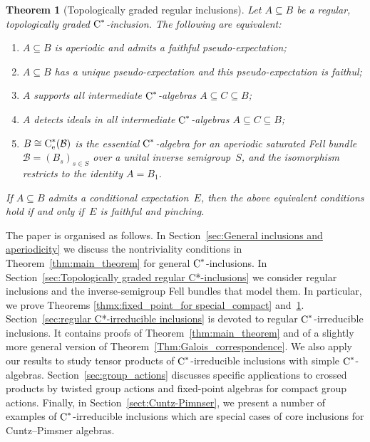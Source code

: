 \documentclass[a4paper]{amsart}
\theoremstyle{plain}
\newtheorem{thmx}{Theorem}
\theoremstyle{definition}
\theoremstyle{remark}
\numberwithin{theorem}{section}
\numberwithin{equation}{section}
\newcommand*{\nb}{\nobreakdash}
\newcommand*{\ess}{\mathrm{e}}%
\newcommand*{\Cst}{\textup C^*}%
\newcommand*{\B}{\mathcal B}%
\begin{document}
\begin{thmx}[Topologically graded regular inclusions]
  \label{thmx:topologically_graded_aperiodic}
  Let \(A\subseteq B\) be a regular, topologically graded
  \(\Cst\)\nb-inclusion.
  The following are equivalent:
  \begin{enumerate}
  \item \label{enu:topologically_graded_aperiodic1}%
    \(A\subseteq B\) is aperiodic and admits a faithful
    pseudo-expectation;
  \item \label{enu:topologically_graded_aperiodic2}%
    \(A\subseteq B\) has a unique pseudo-expectation and this
    pseudo-expectation is faithul;
  \item \label{enu:topologically_graded_aperiodic3}%
    \(A\) supports all intermediate \(\Cst\)\nb-algebras \(A\subseteq
    C\subseteq B\);
  \item \label{enu:topologically_graded_aperiodic4}%
    \(A\) detects ideals in all intermediate \(\Cst\)\nb-algebras
    \(A\subseteq C \subseteq B\);
  \item \label{enu:topologically_graded_aperiodic5}%
    \(B\cong \Cst_\ess(\B)\) is the essential \(\Cst\)\nb-algebra for
    an aperiodic saturated Fell bundle \(\B=(B_s)_{s\in S}\) over a
    unital inverse semigroup~\(S\), and the isomorphism restricts to
    the identity \(A=B_1\).
  \end{enumerate}
  If \(A\subseteq B\) admits a conditional expectation~\(E\), then the
  above equivalent conditions hold if and only if~\(E\) is faithful
  and pinching.
\end{thmx}

The paper is organised as follows.
In Section~\ref{sec:General inclusions and aperiodicity} we discuss
the nontriviality conditions in Theorem~\ref{thm:main_theorem} for
general \(\Cst\)\nb-inclusions.
In Section~\ref{sec:Topologically graded regular C*-inclusions} we
consider regular inclusions and the inverse-semigroup Fell bundles
that model them.
In particular, we prove Theorems \ref{thmx:fixed_point_for
  special_compact} and~\ref{thmx:topologically_graded_aperiodic}.
Section~\ref{sec:regular C*-irreducible inclusions} is devoted to
regular \(\Cst\)\nb-irreducible inclusions.
It contains proofs of Theorem~\ref{thm:main_theorem} and of a slightly
more general version of Theorem~\ref{Thm:Galois_correspondence}.
We also apply our results to study tensor products of
\(\Cst\)\nb-irreducible inclusions with simple \(\Cst\)\nb-algebras.
Section~\ref{sec:group_actions} discusses specific applications to
crossed products by twisted group actions and fixed-point algebras for
compact group actions.
Finally, in Section~\ref{sect:Cuntz-Pimnser}, we present a number of
examples of \(\Cst\)\nb-irreducible inclusions which are special cases
of core inclusions for Cuntz--Pimsner algebras.
\end{document}

